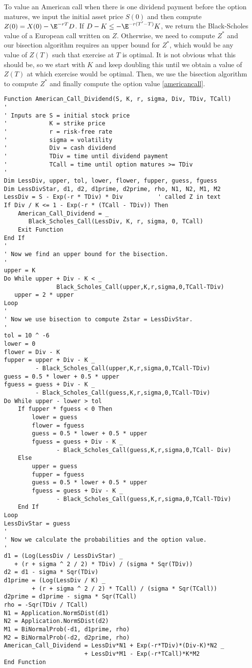 To value an American call when there is one dividend payment before the option matures, we input the initial asset price $S(0)$ and then compute $Z(0)=X(0)-\E^{-rT}D$.  If $D-K \leq -\E^{-r(T'-T)}K$, we return the Black-Scholes value of a European call written on $Z$.  Otherwise, we need to compute $Z^*$ and our bisection algorithm requires an upper bound for $Z^*$, which would be any value of $Z(T)$ such that exercise at $T$ is optimal.  It is not obvious what this should be, so we start with $K$ and keep doubling this until we obtain a value of $Z(T)$ at which exercise would be optimal.  Then, we use the bisection algorithm to compute $Z^*$ and finally compute the option value \eqref{americancall}.
\small\begin{verbatim}
Function American_Call_Dividend(S, K, r, sigma, Div, TDiv, TCall)
'
' Inputs are S = initial stock price
'            K = strike price
'            r = risk-free rate
'            sigma = volatility
'            Div = cash dividend
'            TDiv = time until dividend payment
'            TCall = time until option matures >= TDiv
'
Dim LessDiv, upper, tol, lower, flower, fupper, guess, fguess
Dim LessDivStar, d1, d2, d1prime, d2prime, rho, N1, N2, M1, M2
LessDiv = S - Exp(-r * TDiv) * Div          ' called Z in text
If Div / K <= 1 - Exp(-r * (TCall - TDiv)) Then  
    American_Call_Dividend = _
       Black_Scholes_Call(LessDiv, K, r, sigma, 0, TCall)
    Exit Function
End If
'
' Now we find an upper bound for the bisection.
'
upper = K
Do While upper + Div - K < _
               Black_Scholes_Call(upper,K,r,sigma,0,TCall-TDiv)
   upper = 2 * upper
Loop
'
' Now we use bisection to compute Zstar = LessDivStar.
'
tol = 10 ^ -6
lower = 0
flower = Div - K
fupper = upper + Div - K _
         - Black_Scholes_Call(upper,K,r,sigma,0,TCall-TDiv)
guess = 0.5 * lower + 0.5 * upper
fguess = guess + Div - K _
         - Black_Scholes_Call(guess,K,r,sigma,0,TCall-TDiv)
Do While upper - lower > tol
    If fupper * fguess < 0 Then
        lower = guess
        flower = fguess
        guess = 0.5 * lower + 0.5 * upper
        fguess = guess + Div - K _
               - Black_Scholes_Call(guess,K,r,sigma,0,TCall- Div)
    Else
        upper = guess
        fupper = fguess
        guess = 0.5 * lower + 0.5 * upper
        fguess = guess + Div - K _
               - Black_Scholes_Call(guess,K,r,sigma,0,TCall-TDiv)
    End If
Loop
LessDivStar = guess
'
' Now we calculate the probabilities and the option value.
'
d1 = (Log(LessDiv / LessDivStar) _
   + (r + sigma ^ 2 / 2) * TDiv) / (sigma * Sqr(TDiv))
d2 = d1 - sigma * Sqr(TDiv)
d1prime = (Log(LessDiv / K) _
        + (r + sigma ^ 2 / 2) * TCall) / (sigma * Sqr(TCall))
d2prime = d1prime - sigma * Sqr(TCall)
rho = -Sqr(TDiv / TCall)
N1 = Application.NormSDist(d1)
N2 = Application.NormSDist(d2)
M1 = BiNormalProb(-d1, d1prime, rho)
M2 = BiNormalProb(-d2, d2prime, rho)
American_Call_Dividend = LessDiv*N1 + Exp(-r*TDiv)*(Div-K)*N2 _
                       + LessDiv*M1 - Exp(-r*TCall)*K*M2
End Function
\end{verbatim}\normalsize

